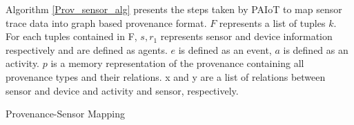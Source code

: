 \documentclass[conference]{IEEEtran}
\begin{document}








Algorithm \ref{Prov_sensor_alg} presents the steps taken by PAIoT to map sensor trace data into graph based provenance format. $F$  represents a  list of tuples $k$. For each tuples contained in F, $s, r_1$ represents sensor and device information respectively and are defined as agents. $e$ is defined as an event, $a$ is defined as an activity. $p$ is a memory representation of the provenance containing all  provenance types and their relations. x and y are a list of relations between sensor and device and activity and sensor, respectively.

\begin{algorithm}[h!]
\caption{Provenance-Sensor Mapping}
\label{Prov_sensor_alg}

\end{algorithm}
\end{document}
